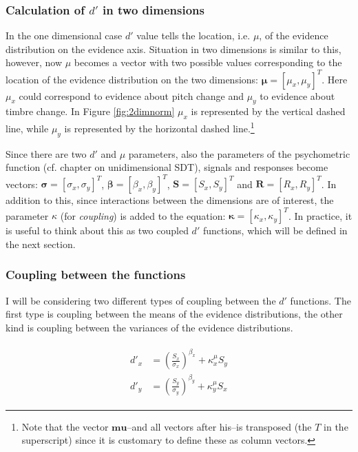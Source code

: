 \documentclass{article}\usepackage{knitr}
\begin{document}
\subsubsection{Calculation of $d'$ in two dimensions}

In the one dimensional case $d'$ value tells the location, i.e. $\mu$, of the evidence distribution on the evidence axis. Situation in two dimensions is similar to this, however, now $\mu$ becomes a vector with two possible values corresponding to the location of the evidence distribution on the two dimensions: $\bm{\mu} = [\mu_x, \mu_y]^T$. Here $\mu_x$ could correspond to evidence about pitch change and $\mu_y$ to evidence about timbre change. In Figure \ref{fig:2dimnorm} $\mu_x$ is represented by the vertical dashed line, while $\mu_y$ is represented by the horizontal dashed line.\footnote{Note that the vector $\bm{mu}$--and all vectors after his--is transposed (the $T$ in the superscript) since it is customary to define these as column vectors.}

Since there are two $d'$ and $\mu$ parameters, also the parameters of the psychometric function (cf. chapter on unidimensional SDT), signals and responses become vectors: $\bm{\sigma} = [\sigma_x, \sigma_y]^T$, $\bm{\beta} = [\beta_x, \beta_y]^T$, $\bm{S} = [S_x, S_y]^T$ and $\bm{R} = [R_x, R_y]^T$. In addition to this, since interactions between the dimensions are of interest, the parameter $\kappa$ (for \textit{coupling}) is added to the equation: $\bm{\kappa} = [\kappa_x, \kappa_y]^T$. In practice, it is useful to think about this as two coupled $d'$ functions, which will be defined in the next section.

\subsubsection{Coupling between the functions}

I will be considering two different types of coupling between the $d'$ functions. The first type is coupling between the means of the evidence distributions, the other kind is coupling between the variances of the evidence distributions. 

\begin{align}
\label{eq:twodimdprime}
\begin{split}
d'_x &= (\frac{S_x}{\sigma_x})^{\beta_x} + \kappa_x^{\mu} S_y \\
d'_y &= (\frac{S_y}{\sigma_y})^{\beta_y} + \kappa_y^{\mu} S_x
\end{split}
\end{align}
\end{document}
